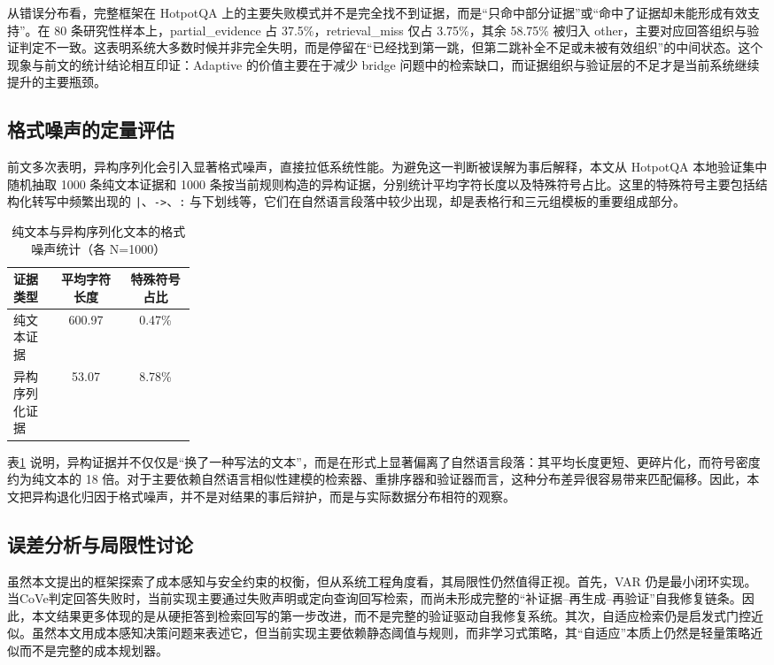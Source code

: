 从错误分布看，完整框架在 HotpotQA 上的主要失败模式并不是完全找不到证据，而是“只命中部分证据”或“命中了证据却未能形成有效支持”。在 80 条研究性样本上，partial\_evidence 占 37.5\%，retrieval\_miss 仅占 3.75\%，其余 58.75\% 被归入 other，主要对应回答组织与验证判定不一致。这表明系统大多数时候并非完全失明，而是停留在“已经找到第一跳，但第二跳补全不足或未被有效组织”的中间状态。这个现象与前文的统计结论相互印证：Adaptive 的价值主要在于减少 bridge 问题中的检索缺口，而证据组织与验证层的不足才是当前系统继续提升的主要瓶颈。

\subsection{格式噪声的定量评估}

前文多次表明，异构序列化会引入显著格式噪声，直接拉低系统性能。为避免这一判断被误解为事后解释，本文从 HotpotQA 本地验证集中随机抽取 1000 条纯文本证据和 1000 条按当前规则构造的异构证据，分别统计平均字符长度以及特殊符号占比。这里的特殊符号主要包括结构化转写中频繁出现的 \texttt{|}、\texttt{->}、\texttt{:} 与下划线等，它们在自然语言段落中较少出现，却是表格行和三元组模板的重要组成部分。

\begin{table}[!htbp]
\centering
\caption{纯文本与异构序列化文本的格式噪声统计（各 N=1000）}
\label{tab:format_noise}
\small
\begin{tabular}{|p{0.24\linewidth}|c|c|}
\hline
\textbf{证据类型} & \textbf{平均字符长度} & \textbf{特殊符号占比} \\
\hline
纯文本证据 & 600.97 & 0.47\% \\
\hline
异构序列化证据 & 53.07 & 8.78\% \\
\hline
\end{tabular}
\end{table}

表\ref{tab:format_noise} 说明，异构证据并不仅仅是“换了一种写法的文本”，而是在形式上显著偏离了自然语言段落：其平均长度更短、更碎片化，而符号密度约为纯文本的 18 倍。对于主要依赖自然语言相似性建模的检索器、重排序器和验证器而言，这种分布差异很容易带来匹配偏移。因此，本文把异构退化归因于格式噪声，并不是对结果的事后辩护，而是与实际数据分布相符的观察。

\subsection{误差分析与局限性讨论}

虽然本文提出的框架探索了成本感知与安全约束的权衡，但从系统工程角度看，其局限性仍然值得正视。首先，VAR 仍是最小闭环实现。当CoVe判定回答失败时，当前实现主要通过失败声明或定向查询回写检索，而尚未形成完整的“补证据--再生成--再验证”自我修复链条。因此，本文结果更多体现的是从硬拒答到检索回写的第一步改进，而不是完整的验证驱动自我修复系统。其次，自适应检索仍是启发式门控近似。虽然本文用成本感知决策问题来表述它，但当前实现主要依赖静态阈值与规则，而非学习式策略，其“自适应”本质上仍然是轻量策略近似而不是完整的成本规划器。

